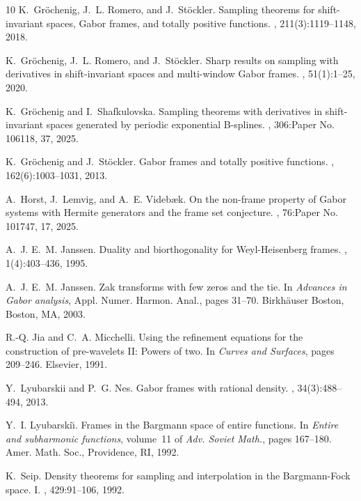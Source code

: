\documentclass[12pt]{amsart}
\numberwithin{equation}{section}
\begin{document}
\begin{thebibliography}{10}
K.~Gr\"ochenig, J.~L. Romero, and J.~St\"ockler.
\newblock Sampling theorems for shift-invariant spaces, {G}abor frames, and totally positive functions.
, 211(3):1119--1148, 2018.

K.~Gr\"ochenig, J.~L. Romero, and J.~St\"ockler.
\newblock Sharp results on sampling with derivatives in shift-invariant spaces and multi-window {G}abor frames.
, 51(1):1--25, 2020.

K.~Gr\"ochenig and I.~Shafkulovska.
\newblock Sampling theorems with derivatives in shift-invariant spaces generated by periodic exponential {B}-splines.
, 306:Paper No. 106118, 37, 2025.

K.~Gr\"{o}chenig and J.~St\"{o}ckler.
\newblock Gabor frames and totally positive functions.
, 162(6):1003--1031, 2013.

A.~Horst, J.~Lemvig, and A.~E. Videb{\ae}k.
\newblock On the non-frame property of {G}abor systems with {H}ermite generators and the frame set conjecture.
, 76:Paper No. 101747, 17, 2025.

A.~J. E.~M. Janssen.
\newblock Duality and biorthogonality for {W}eyl-{H}eisenberg frames.
, 1(4):403--436, 1995.

A.~J. E.~M. Janssen.
\newblock Zak transforms with few zeros and the tie.
\newblock In {\em Advances in {G}abor analysis}, Appl. Numer. Harmon. Anal., pages 31--70. Birkh\"auser Boston, Boston, MA, 2003.

R.-Q. Jia and C.~A. Micchelli.
\newblock Using the refinement equations for the construction of pre-wavelets {II}: Powers of two.
\newblock In {\em Curves and Surfaces}, pages 209--246. Elsevier, 1991.

Y.~Lyubarskii and P.~G. Nes.
\newblock Gabor frames with rational density.
, 34(3):488--494, 2013.

Y.~I. Lyubarski\u{\i}.
\newblock Frames in the {B}argmann space of entire functions.
\newblock In {\em Entire and subharmonic functions}, volume~11 of {\em Adv. Soviet Math.}, pages 167--180. Amer. Math. Soc., Providence, RI, 1992.

K.~Seip.
\newblock Density theorems for sampling and interpolation in the {B}argmann-{F}ock space. {I}.
, 429:91--106, 1992.


\end{thebibliography}
\end{document}
